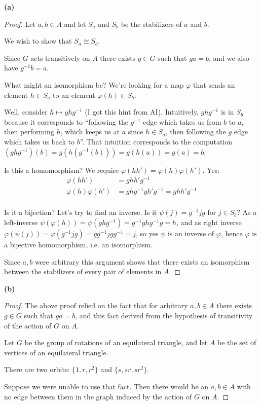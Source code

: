 {\bf (a)}\\
\begin{proof}
  Let $a, b \in A$ and let $S_a$ and $S_b$ be the stabilizers of $a$ and $b$.

  We wish to show that $S_a \cong S_b$.

  Since $G$ acts transitively on $A$ there exists $g \in G$ such that $ga = b$, and we also
  have $g^{-1}b = a$.

  What might an isomorphism be? We're looking for a map $\varphi$ that sends an element $h \in S_a$ to an
  element $\varphi(h) \in S_b$.

  Well, consider $h \mapsto ghg^{-1}$ (I got this hint from AI). Intuitively, $ghg^{-1}$ is in
  $S_b$ because it corresponds to ``following the $g^{-1}$ edge which takes us from $b$ to $a$, then
  performing $h$, which keeps us at $a$ since $h \in S_a$, then following the $g$ edge which takes us
  back to $b$​''. That intuition corresponds to the
  computation $(ghg^{-1})(b) = g(h(g^{-1}(b))) = g(h(a)) = g(a) = b$.

  Is this a homomorphism? We require $\varphi(hh') = \varphi(h)\varphi(h')$. Yes:
  \begin{align*}
    \varphi(hh')    &= ghh'g^{-1} \\
    \varphi(h)\varphi(h') &= ghg^{-1}gh'g^{-1} = ghh'g^{-1}\\
  \end{align*}

  Is it a bijection? Let's try to find an inverse. Is it $\psi(j) = g^{-1}jg$ for $j \in S_b$? As a
  left-inverse $\psi(\varphi(h)) = \psi(ghg^{-1}) = g^{-1}ghg^{-1}g = h$, and as right
  inverse $\varphi(\psi(j)) = \varphi(g^{-1}jg) = gg^{-1}jgg^{-1} = j$, so yes $\psi$ is an inverse of
  $\varphi$, hence $\varphi$ is a bijective homomorphism, i.e. an isomorphism.

  Since $a, b$ were arbitrary this argument shows that there exists an isomorphism between the
  stabilizers of every pair of elements in $A$.
\end{proof}


{\bf (b)}\\

\begin{proof}
  The above proof relied on the fact that for arbitrary $a, b \in A$ there exists $g \in G$ such
  that $ga = b$, and this fact derived from the hypothesis of transitivity of the action of $G$
  on $A$.

  Let $G$ be the group of rotations of an equilateral triangle, and let $A$ be the set of vertices
  of an equilateral triangle.

  There are two orbits: $\{1, r, r^2\}$ and $\{s, sr, sr^2\}$.






  Suppose we were unable to use that fact. Then there would be an $a, b \in A$ with no edge between
  them in the graph induced by the action of $G$ on $A$.
\end{proof}

